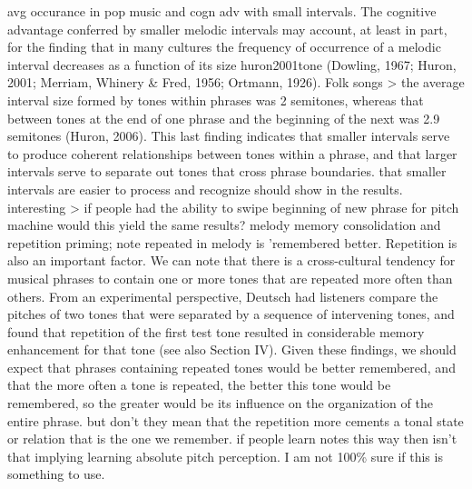 avg occurance in pop music and cogn adv with small intervals. The cognitive advantage conferred by smaller melodic intervals may account, at least in part, for the finding that in many cultures the frequency of occurrence of a melodic interval decreases as a function of its size \cite{dowling1967rhythmic} {huron2001tone} \cite{merriam1956songs} \cite{ortmann1926melodic} \cite{huron2006sweet} (Dowling, 1967; Huron, 2001; Merriam, Whinery & Fred, 1956; Ortmann, 1926). Folk songs > the average interval size formed by tones within phrases was 2 semitones, whereas that between tones at the end of one phrase and the beginning of the next was 2.9 semitones (Huron, 2006). This last finding indicates that smaller intervals serve to produce coherent relationships between tones within a phrase, and that larger intervals serve to separate out tones that cross phrase boundaries. that smaller intervals are easier to process and recognize should show in the results. interesting > if people had the ability to swipe beginning of new phrase for pitch machine would this yield the same results?
melody memory consolidation and repetition priming; note repeated in melody is 'remembered better. Repetition is also an important factor. We can note that there is a cross-cultural tendency for musical phrases to contain one or more tones that are repeated more often than others. From an experimental perspective, Deutsch had listeners compare the pitches of two tones that were separated by a sequence of intervening tones, and found that repetition of the first test tone resulted in considerable memory enhancement for that tone \cite{deutsch1970dislocation} \cite{deutsch1972effect} \cite{deutsch1975facilitation} (see also Section IV). Given these findings, we should expect that phrases containing repeated tones would be better remembered, and that the more often a tone is repeated, the better this tone would be remembered, so the greater would be its influence on the organization of the entire phrase. but don't they mean that the repetition more cements a tonal state or relation that is the one we remember. if people learn notes this way then isn't that implying learning absolute pitch perception. I am not 100\% sure if this is something to use.
